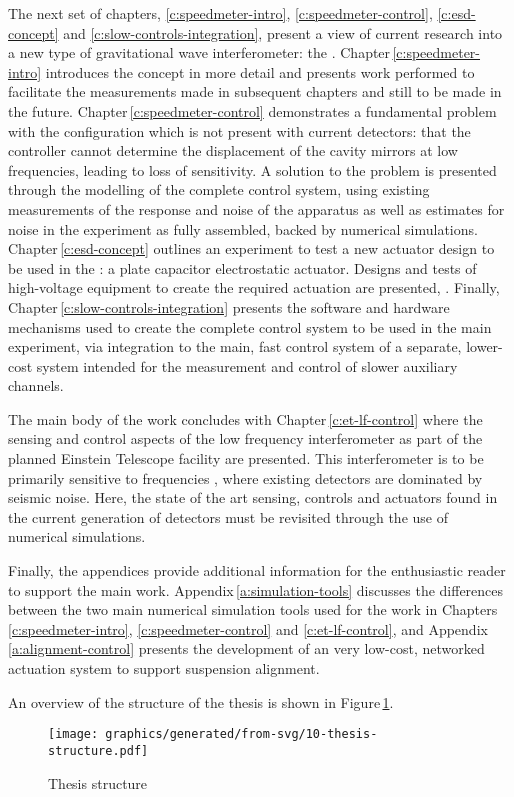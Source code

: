 The next set of chapters, \ref{c:speedmeter-intro}, \ref{c:speedmeter-control}, \ref{c:esd-concept} and \ref{c:slow-controls-integration}, present a view of current research into a new type of gravitational wave interferometer: the \SSM{}. Chapter\,\ref{c:speedmeter-intro} introduces the concept in more detail and presents work performed to facilitate the measurements made in subsequent chapters and still to be made in the future. Chapter\,\ref{c:speedmeter-control} demonstrates a fundamental problem with the \SSM{} configuration which is not present with current detectors: that the controller cannot determine the displacement of the cavity mirrors at low frequencies, leading to loss of sensitivity. A solution to the problem is presented through the modelling of the complete control system, using existing measurements of the response and noise of the apparatus as well as estimates for noise in the experiment as fully assembled, backed by numerical simulations. Chapter\,\ref{c:esd-concept} outlines an experiment to test a new actuator design to be used in the \SSMEXPT{}: a plate capacitor electrostatic actuator. Designs and tests of high-voltage equipment to create the required actuation are presented, . Finally, Chapter\,\ref{c:slow-controls-integration} presents the software and hardware mechanisms used to create the complete control system to be used in the main experiment, via integration to the main, fast control system of a separate, lower-cost system intended for the measurement and control of slower auxiliary channels.

The main body of the work concludes with Chapter\,\ref{c:et-lf-control} where the sensing and control aspects of the low frequency interferometer as part of the planned Einstein Telescope facility are presented. This interferometer is to be primarily sensitive to frequencies , where existing detectors are dominated by seismic noise. Here, the state of the art sensing, controls and actuators found in the current generation of detectors must be revisited through the use of numerical simulations.

Finally, the appendices provide additional information for the enthusiastic reader to support the main work. Appendix\,\ref{a:simulation-tools} discusses the differences between the two main numerical simulation tools used for the work in Chapters \ref{c:speedmeter-intro}, \ref{c:speedmeter-control} and \ref{c:et-lf-control}, and Appendix\,\ref{a:alignment-control} presents the development of an very low-cost, networked actuation system to support suspension alignment.

An overview of the structure of the thesis is shown in Figure\,\ref{fig:thesis-structure}.

\begin{figure}
  \centering
  \texttt{[image: graphics/generated/from-svg/10-thesis-structure.pdf]}
  \caption[Thesis structure]{\label{fig:thesis-structure}Thesis structure }
\end{figure}